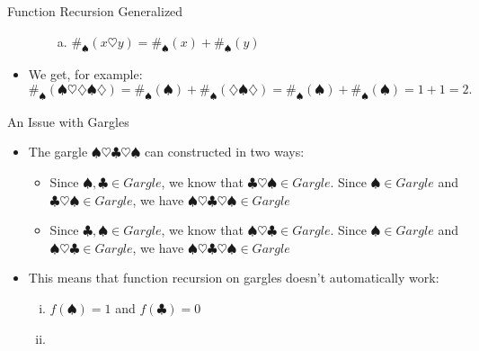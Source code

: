 \begin{frame}{Function Recursion Generalized}
\begin{itemize}
\begin{enumerate}[(i)]
\begin{enumerate}[(a)]
					\item $\#_\spadesuit(x\heartsuit y)=\#_\spadesuit(x)+\#_\spadesuit(y)$		
		\end{enumerate}
		
	\end{enumerate}
	
	\item We get, for example:{\small\[\#_\spadesuit(\spadesuit\heartsuit\diamondsuit\spadesuit\diamondsuit)=\#_\spadesuit(\spadesuit)+\#_\spadesuit(\diamondsuit\spadesuit\diamondsuit)=\#_\spadesuit(\spadesuit)+\#_\spadesuit(\spadesuit)=1+1=2.\]}
	
	\end{itemize}

\end{frame}

\begin{frame}{An Issue with Gargles}

	\begin{itemize}
	
		\item The gargle $\spadesuit\heartsuit\clubsuit\heartsuit\spadesuit$ can constructed in two ways: 
		\begin{itemize}
		
			\item Since $\spadesuit,\clubsuit\in Gargle$, we know that $\clubsuit\heartsuit\spadesuit\in Gargle$. Since $\spadesuit\in Gargle$ and $\clubsuit\heartsuit\spadesuit\in Gargle$, we have $\spadesuit\heartsuit\clubsuit\heartsuit\spadesuit\in Gargle$
		
			\item Since $\clubsuit,\spadesuit\in Gargle$, we know that $\spadesuit\heartsuit\clubsuit\in Gargle$. Since $\spadesuit\in Gargle$ and $\spadesuit\heartsuit\clubsuit\in Gargle$, we have $\spadesuit\heartsuit\clubsuit\heartsuit\spadesuit\in Gargle$
		
		\end{itemize}
		
		\item This means that function recursion on gargles doesn't automatically work:
		
		\begin{enumerate}[(i)]
		
			\item $f(\spadesuit)=1$ and $f(\clubsuit)=0$
			
			\item \begin{enumerate}[(a)]
			

\end{enumerate}
\end{enumerate}
\end{itemize}
\end{frame}

